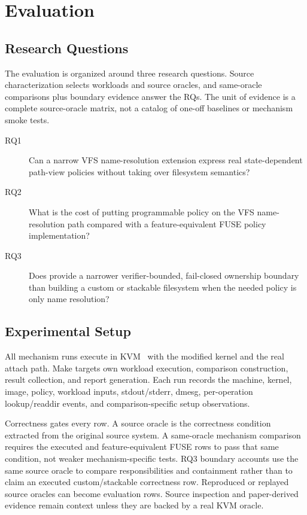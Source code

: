 \section{Evaluation}
\label{sec:evaluation}

\subsection{Research Questions}

The evaluation is organized around three research questions. Source
characterization selects workloads and source oracles, and same-oracle
comparisons plus boundary evidence answer the RQs.
The unit of evidence is a complete source-oracle matrix, not a catalog of
one-off baselines or mechanism smoke tests.

\begin{description}
\item[RQ1] Can a narrow VFS name-resolution extension express real
state-dependent path-view policies without taking over filesystem semantics?
\item[RQ2] What is the cost of putting programmable policy on the VFS
name-resolution path compared with a feature-equivalent FUSE policy
implementation?
\item[RQ3] Does \namei provide a narrower verifier-bounded, fail-closed
ownership boundary than building a custom or stackable filesystem when the
needed policy is only name resolution?
\end{description}

\subsection{Experimental Setup}

All \namei mechanism runs execute in KVM~\cite{linux_kvm} with the modified
kernel and the real  attach path. Make targets own
workload execution, comparison construction, result collection, and report
generation. Each run records the machine, kernel, image, policy, workload
inputs, stdout/stderr, dmesg, per-operation lookup/readdir events, and
comparison-specific setup observations.

Correctness gates every row. A source oracle is the correctness condition
extracted from the original source system. A same-oracle mechanism comparison
requires the executed \namei and feature-equivalent FUSE rows to pass that same
condition, not weaker mechanism-specific tests. RQ3 boundary accounts use the
same source oracle to compare responsibilities and containment rather than to
claim an executed custom/stackable correctness row. Reproduced or replayed
source oracles can become evaluation rows. Source inspection and paper-derived
evidence remain context unless they are backed by a real KVM oracle.

